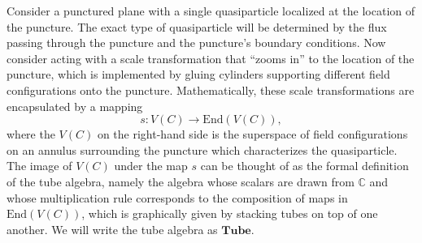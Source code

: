 \documentclass[12pt,a4paper]{article}
\newcounter{arrow}
\newcommand{\tp}{\otimes}
\newcommand{\ra}{\rightarrow}
\newcommand{\cc}{\mathbb{C}}
\newcommand{\zt}{\mathbb{Z}_2}
\newcommand\be            {\begin{equation}}
\newcommand\ee            {\end{equation}}
\newcommand{\End}{\text{End}}
\newcommand{\fube}{\textbf{Tube}}
\newcommand{\fld}{\mathcal{F}} %
\begin{document}



Consider a punctured plane with a single quasiparticle localized at the location of the puncture. The exact type of quasiparticle will be determined by the flux passing through the puncture and the puncture's boundary conditions. Now consider acting with a scale transformation that ``zooms in'' to the location of the puncture, which is implemented by gluing cylinders supporting different field configurations onto the puncture. Mathematically, these scale transformations are encapsulated by a mapping 
\be s : V(C) \ra \End(V(C)),\ee
where the $V(C)$ on the right-hand side is the superspace of field configurations on an annulus surrounding the puncture which characterizes the quasiparticle. The image of $V(C)$ under the map $s$ can be thought of as the formal definition of the tube algebra, namely the algebra whose scalars are drawn from $\cc$ and whose multiplication rule corresponds to the composition of maps in $\End(V(C))$, which is graphically given by stacking tubes on top of one another. We will write the tube algebra as $\fube$.	
\end{document}
